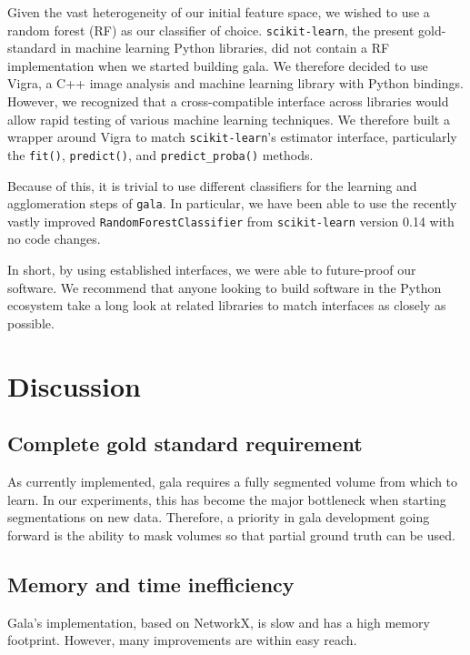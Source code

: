 \documentclass{frontiersSCNS} %
\begin{document}
Given the vast heterogeneity of our initial feature space, we wished to use a random forest (RF) as our classifier of choice.
\texttt{\small scikit-learn}, the present gold-standard in machine learning Python libraries, did not contain a RF implementation when we started building gala.
We therefore decided to use Vigra, a C++ image analysis and machine learning library with Python bindings.
However, we recognized that a cross-compatible interface across libraries would allow rapid testing of various machine learning techniques.
We therefore built a wrapper around Vigra to match \texttt{\small scikit-learn}'s estimator interface, particularly the \texttt{\small fit()}, \texttt{\small predict()}, and \texttt{\small predict\_proba()} methods.

Because of this, it is trivial to use different classifiers for the learning and agglomeration steps of \texttt{\small gala}.
In particular, we have been able to use the recently vastly improved \texttt{\small RandomForestClassifier} from \texttt{\small scikit-learn} version 0.14 with no code changes.

In short, by using established interfaces, we were able to future-proof our software.
We recommend that anyone looking to build software in the Python ecosystem take a long look at related libraries to match interfaces as closely as possible.


\section{Discussion}


\subsection{Complete gold standard requirement}

As currently implemented, gala requires a fully segmented volume from which to learn.
In our experiments, this has become the major bottleneck when starting segmentations on new data.
Therefore, a priority in gala development going forward is the ability to mask volumes so that partial ground truth can be used.

\subsection{Memory and time inefficiency}

Gala's implementation, based on NetworkX, is slow and has a high memory footprint.
However, many improvements are within easy reach.
\end{document}
